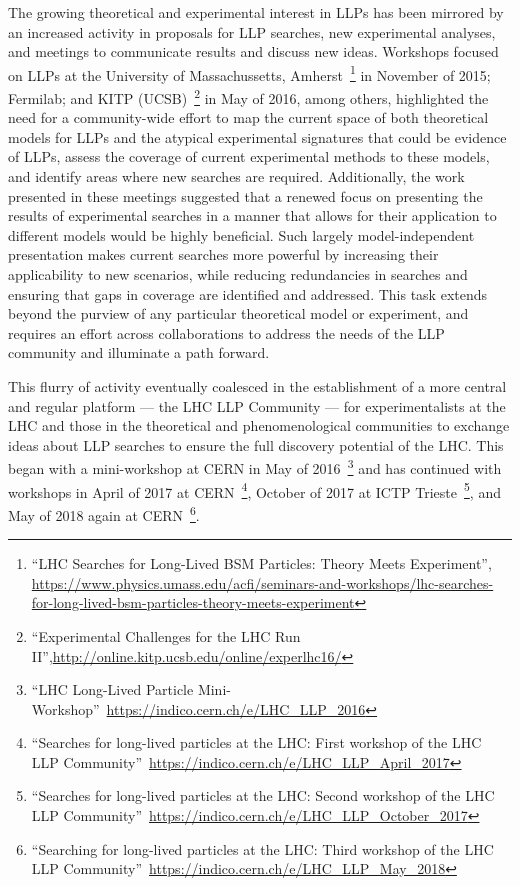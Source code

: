 The growing theoretical and experimental interest in LLPs has been mirrored by an increased activity in proposals for LLP searches, new experimental analyses, and meetings to communicate results and discuss new ideas.
Workshops focused on LLPs at the University of Massachussetts, Amherst~\footnote{``LHC Searches for Long-Lived BSM Particles: Theory Meets Experiment'', \url{https://www.physics.umass.edu/acfi/seminars-and-workshops/lhc-searches-for-long-lived-bsm-particles-theory-meets-experiment}} in November of 2015; Fermilab; and KITP (UCSB)~\footnote{``Experimental Challenges for the LHC Run II'',\url{http://online.kitp.ucsb.edu/online/experlhc16/}} in May of 2016, among others, highlighted the need for a community-wide effort to map the current space of both theoretical models for LLPs and the atypical experimental signatures that could be evidence of LLPs, assess the coverage of current experimental methods to these models, and identify areas where new searches are required.
Additionally, the work presented in these meetings suggested that a renewed focus on presenting the results of experimental searches in a manner that allows for their application to different models would be highly beneficial.
Such largely model-independent presentation makes current searches more powerful by increasing their applicability to new scenarios, while reducing redundancies in searches and ensuring that gaps in coverage are identified and addressed.
This task extends beyond the purview of any particular theoretical model or experiment, and requires an effort across collaborations to address the needs of the LLP community and illuminate a path forward.

This flurry of activity eventually coalesced in the establishment of a more central and regular platform --- the LHC LLP Community --- for experimentalists at the LHC and those in the theoretical and phenomenological communities to exchange ideas about LLP searches to ensure the full discovery potential of the LHC.
This began with a mini-workshop at CERN in May of 2016~\footnote{``LHC Long-Lived Particle Mini-Workshop''~\url{https://indico.cern.ch/e/LHC_LLP_2016}} and has continued with workshops in April of 2017 at CERN~\footnote{``Searches for long-lived particles at the LHC: First workshop of the LHC LLP Community''~\url{https://indico.cern.ch/e/LHC_LLP_April_2017}}, October of 2017 at ICTP Trieste~\footnote{``Searches for long-lived particles at the LHC: Second workshop of the LHC LLP Community''~\url{https://indico.cern.ch/e/LHC_LLP_October_2017}}, and May of 2018 again at CERN~\footnote{``Searching for long-lived particles at the LHC: Third workshop of the LHC LLP Community''~\url{https://indico.cern.ch/e/LHC_LLP_May_2018}}.

